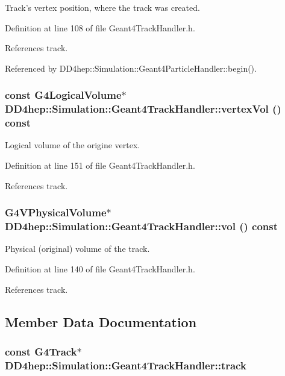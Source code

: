 Track's vertex position, where the track was created. 

Definition at line 108 of file Geant4TrackHandler.h.

References track.

Referenced by DD4hep::Simulation::Geant4ParticleHandler::begin().\hypertarget{class_d_d4hep_1_1_simulation_1_1_geant4_track_handler_af5209e28628bd58a99d0ca28299d94e9}{
\subsubsection[{vertexVol}]{\setlength{\rightskip}{0pt plus 5cm}const G4LogicalVolume$\ast$ DD4hep::Simulation::Geant4TrackHandler::vertexVol () const}}
\label{class_d_d4hep_1_1_simulation_1_1_geant4_track_handler_af5209e28628bd58a99d0ca28299d94e9}


Logical volume of the origine vertex. 

Definition at line 151 of file Geant4TrackHandler.h.

References track.\hypertarget{class_d_d4hep_1_1_simulation_1_1_geant4_track_handler_abd177f86afc0aa606d25ddb60e7766d4}{
\subsubsection[{vol}]{\setlength{\rightskip}{0pt plus 5cm}G4VPhysicalVolume$\ast$ DD4hep::Simulation::Geant4TrackHandler::vol () const}}
\label{class_d_d4hep_1_1_simulation_1_1_geant4_track_handler_abd177f86afc0aa606d25ddb60e7766d4}


Physical (original) volume of the track. 

Definition at line 140 of file Geant4TrackHandler.h.

References track.

\subsection{Member Data Documentation}
\hypertarget{class_d_d4hep_1_1_simulation_1_1_geant4_track_handler_a40a5ac7eb61ca69314a64f9f3c5a0f0b}{
\subsubsection[{track}]{\setlength{\rightskip}{0pt plus 5cm}const G4Track$\ast$ {\bf DD4hep::Simulation::Geant4TrackHandler::track}}}
\label{class_d_d4hep_1_1_simulation_1_1_geant4_track_handler_a40a5ac7eb61ca69314a64f9f3c5a0f0b}


